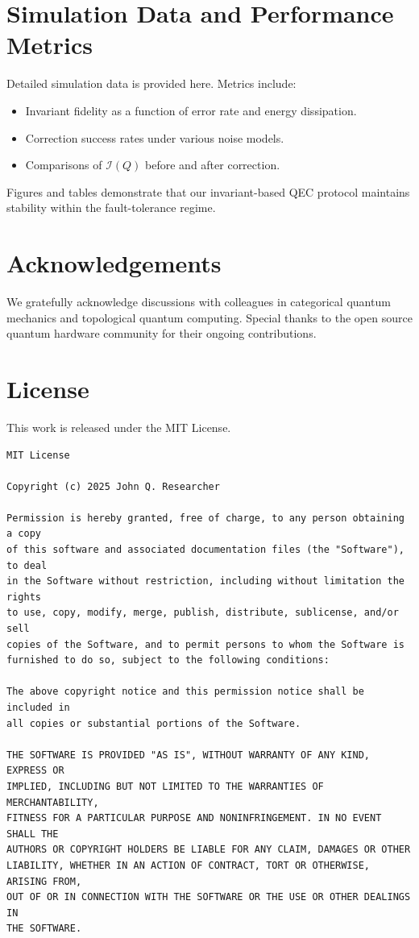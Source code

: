 \documentclass[11pt]{article}
\begin{document}
\appendix
\section{Simulation Data and Performance Metrics}
\label{app:simulations}
Detailed simulation data is provided here. Metrics include:
\begin{itemize}
    \item Invariant fidelity as a function of error rate and energy dissipation.
    \item Correction success rates under various noise models.
    \item Comparisons of \(\mathcal{I}(Q)\) before and after correction.
\end{itemize}
Figures and tables demonstrate that our invariant-based QEC protocol maintains stability within the fault-tolerance regime.

\section*{Acknowledgements}
We gratefully acknowledge discussions with colleagues in categorical quantum mechanics and topological quantum computing. Special thanks to the open source quantum hardware community for their ongoing contributions.

\section*{License}
This work is released under the MIT License.
\begin{verbatim}
MIT License

Copyright (c) 2025 John Q. Researcher

Permission is hereby granted, free of charge, to any person obtaining a copy
of this software and associated documentation files (the "Software"), to deal
in the Software without restriction, including without limitation the rights
to use, copy, modify, merge, publish, distribute, sublicense, and/or sell
copies of the Software, and to permit persons to whom the Software is
furnished to do so, subject to the following conditions:

The above copyright notice and this permission notice shall be included in
all copies or substantial portions of the Software.

THE SOFTWARE IS PROVIDED "AS IS", WITHOUT WARRANTY OF ANY KIND, EXPRESS OR
IMPLIED, INCLUDING BUT NOT LIMITED TO THE WARRANTIES OF MERCHANTABILITY,
FITNESS FOR A PARTICULAR PURPOSE AND NONINFRINGEMENT. IN NO EVENT SHALL THE
AUTHORS OR COPYRIGHT HOLDERS BE LIABLE FOR ANY CLAIM, DAMAGES OR OTHER
LIABILITY, WHETHER IN AN ACTION OF CONTRACT, TORT OR OTHERWISE, ARISING FROM,
OUT OF OR IN CONNECTION WITH THE SOFTWARE OR THE USE OR OTHER DEALINGS IN
THE SOFTWARE.
\end{verbatim}



\end{document}
